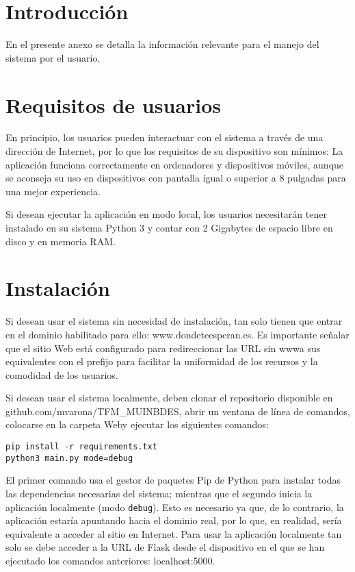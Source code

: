 
\section{Introducción}

En el presente anexo se detalla la información relevante para el manejo del sistema por el usuario.

\section{Requisitos de usuarios}

En principio, los usuarios pueden interactuar con el sistema a través de una dirección de Internet, por lo que los requisitos de su dispositivo son mínimos: La aplicación funciona correctamente en ordenadores y dispositivos móviles, aunque se aconseja su uso en dispositivos con pantalla igual o superior a 8 pulgadas para una mejor experiencia.

Si desean ejecutar la aplicación en modo local, los usuarios necesitarán tener instalado en su sistema Python 3 y contar con 2 Gigabytes de espacio libre en disco y en memoria RAM.

\section{Instalación}

Si desean usar el sistema sin necesidad de instalación, tan solo tienen que entrar en el dominio habilitado para ello: www.dondeteesperan.es. Es importante señalar que el sitio Web está configurado para redireccionar las URL sin \guillemotleft www\guillemotright\space a sus equivalentes con el prefijo para facilitar la uniformidad de los recursos y la comodidad de los usuarios.

Si desean usar el sistema localmente, deben clonar el repositorio disponible en github.com/mvarona/TFM\_MUINBDES, abrir un ventana de línea de comandos, colocarse en la carpeta \guillemotleft Web\guillemotright\space y ejecutar los siguientes comandos:

\begin{verbatim}
pip install -r requirements.txt
python3 main.py mode=debug
\end{verbatim}

El primer comando usa el gestor de paquetes Pip de Python para instalar todas las dependencias necesarias del sistema; mientras que el segundo inicia la aplicación localmente (modo \texttt{debug}). Esto es necesario ya que, de lo contrario, la aplicación estaría apuntando hacia el dominio real, por lo que, en realidad, sería equivalente a acceder al sitio en Internet. Para usar la aplicación localmente tan solo se debe acceder a la URL de Flask desde el dispositivo en el que se han ejecutado los comandos anteriores: localhost:5000.

